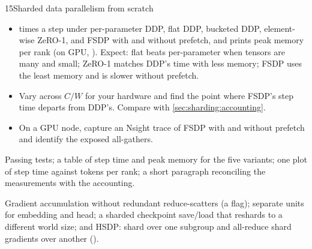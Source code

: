\begin{labbox}{15}{Sharded data parallelism from scratch}
\begin{itemize}
  \item {} times a step under per-parameter DDP, flat DDP, bucketed DDP, element-wise
    ZeRO-1, and FSDP with and without prefetch, and prints peak memory per rank (on GPU,
    ). Expect: flat beats per-parameter when tensors are
    many and small; ZeRO-1 matches DDP's time with less memory; FSDP uses the least memory and is
    slower without prefetch.
  \item Vary  across $C/W$ for your hardware and find the point where
    FSDP's step time departs from DDP's. Compare with \cref{sec:sharding:accounting}.
  \item On a GPU node, capture an Nsight trace of FSDP with and without prefetch and identify the
    exposed all-gathers.
\end{itemize}

Passing tests; a table of step time and peak memory for the five variants; one plot of step time
against tokens per rank; a short paragraph reconciling the measurements with the accounting.

Gradient accumulation without redundant reduce-scatters (a  flag); separate units
for embedding and head; a sharded checkpoint save/load that reshards to a different world size;
and HSDP: shard over one subgroup and all-reduce shard gradients over another
().
\end{labbox}
